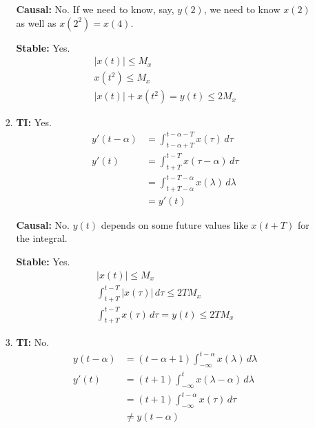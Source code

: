 \documentclass[12pt]{article}
\begin{document}
\begin{enumerate}
\begin{enumerate}
\begin{enumerate}
                                    \textbf{Causal:} No.
                                    If we need to know, say, $y(2)$, we need to know
                                    $x(2)$ as well as $x\left(2^2\right)=x(4)$.

                                    \textbf{Stable:} Yes.
                                    \begin{gather*}
                                          |x(t)| \le M_x \\
                                          x\left(t^2\right) \le M_x \\
                                          |x(t)|+x(t^2)=y(t) \le 2M_x
                                    \end{gather*}
                              \item \textbf{TI:} Yes.
                                    \begin{align*}
                                          y'(t-\alpha) & =\int_{t-\alpha+T}^{t-\alpha-T} x(\tau)\,d\tau        \\
                                          y'(t)        & = \int_{t+T}^{t-T} x(\tau-\alpha)\,d\tau              \\
                                                       & = \int_{t+T-\alpha}^{t-T-\alpha} x(\lambda)\,d\lambda \\
                                                       & = y'(t)
                                    \end{align*}

                                    \textbf{Causal:} No. $y(t)$ depends on some future values like $x(t+T)$ for the integral.

                                    \textbf{Stable:} Yes.
                                    \begin{gather*}
                                          |x(t)| \le M_x \\
                                          \int_{t+T}^{t-T} |x(\tau)|\,d\tau \le 2TM_x \\
                                          \int_{t+T}^{t-T} x(\tau)\,d\tau=y(t) \le 2TM_x
                                    \end{gather*}
                              \item \textbf{TI:} No.
                                    \begin{align*}
                                          y(t-\alpha) & =(t-\alpha+1)\int_{-\infty}^{t-\alpha} x(\lambda)\,d\lambda \\
                                          y'(t)       & =(t+1)\int_{-\infty}^{t} x(\lambda-\alpha)\,d\lambda        \\
                                                      & = (t+1) \int_{-\infty}^{t-\alpha} x(\tau)\,d\tau            \\
                                                      & \ne y(t-\alpha)
                                    \end{align*}


\end{enumerate}
\end{enumerate}
\end{enumerate}
\end{document}
